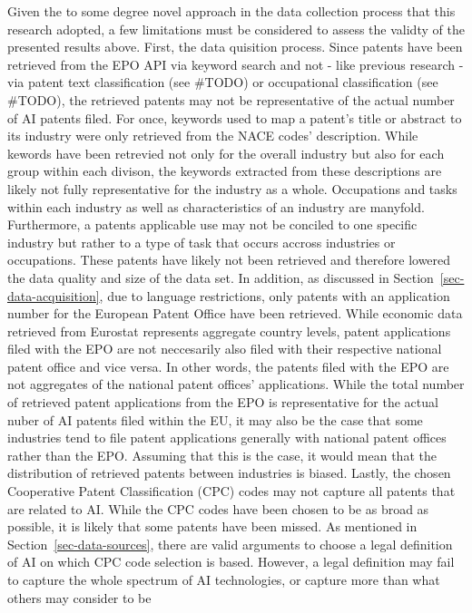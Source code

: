 \documentclass[
  11,
  a4paperpaper,
]{article}
\begin{document}
Given the to some degree novel approach in the data collection process
that this research adopted, a few limitations must be considered to
assess the validty of the presented results above. First, the data
quisition process. Since patents have been retrieved from the EPO API
via keyword search and not - like previous research - via patent text
classification (see \#TODO) or occupational classification (see \#TODO),
the retrieved patents may not be representative of the actual number of
AI patents filed. For once, keywords used to map a patent's title or
abstract to its industry were only retrieved from the NACE codes'
description. While kewords have been retrevied not only for the overall
industry but also for each group within each divison, the keywords
extracted from these descriptions are likely not fully representative
for the industry as a whole. Occupations and tasks within each industry
as well as characteristics of an industry are manyfold. Furthermore, a
patents applicable use may not be conciled to one specific industry but
rather to a type of task that occurs accross industries or occupations.
These patents have likely not been retrieved and therefore lowered the
data quality and size of the data set. In addition, as discussed in
Section~\ref{sec-data-acquisition}, due to language restrictions, only
patents with an application number for the European Patent Office have
been retrieved. While economic data retrieved from Eurostat represents
aggregate country levels, patent applications filed with the EPO are not
neccesarily also filed with their respective national patent office and
vice versa. In other words, the patents filed with the EPO are not
aggregates of the national patent offices' applications. While the total
number of retrieved patent applications from the EPO is representative
for the actual nuber of AI patents filed within the EU, it may also be
the case that some industries tend to file patent applications generally
with national patent offices rather than the EPO. Assuming that this is
the case, it would mean that the distribution of retrieved patents
between industries is biased. Lastly, the chosen Cooperative Patent
Classification (CPC) codes may not capture all patents that are related
to AI. While the CPC codes have been chosen to be as broad as possible,
it is likely that some patents have been missed. As mentioned in
Section~\ref{sec-data-sources}, there are valid arguments to choose a
legal definition of AI on which CPC code selection is based. However, a
legal definition may fail to capture the whole spectrum of AI
technologies, or capture more than what others may consider to be
\end{document}
